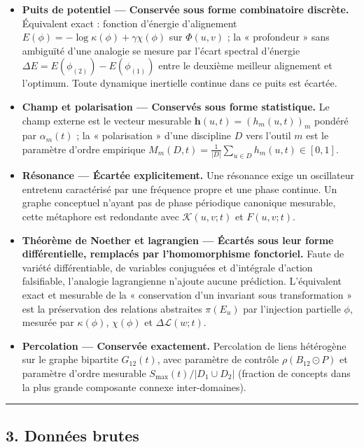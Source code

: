 \documentclass[a4paper,11pt]{article}
\providecommand{\tightlist}{\setlength{\itemsep}{0pt}\setlength{\parskip}{0pt}}
\begin{document}
\begin{itemize}
\tightlist
\item
  \textbf{Puits de potentiel --- Conservée sous forme combinatoire
  discrète.} Équivalent exact : fonction d'énergie d'alignement
  \(E(\phi) = -\log \kappa(\phi) + \gamma \chi(\phi)\) sur \(\Phi(u,v)\)
  ; la « profondeur » sans ambiguïté d'une analogie se mesure par
  l'écart spectral d'énergie
  \(\Delta E = E(\phi_{(2)}) - E(\phi_{(1)})\) entre le deuxième
  meilleur alignement et l'optimum. Toute dynamique inertielle continue
  dans ce puits est écartée.
\item
  \textbf{Champ et polarisation --- Conservés sous forme statistique.}
  Le champ externe est le vecteur mesurable
  \(\mathbf{h}(u,t) = (h_m(u,t))_m\) pondéré par \(\alpha_m(t)\) ; la «
  polarisation » d'une discipline \(D\) vers l'outil \(m\) est le
  paramètre d'ordre empirique
  \(M_m(D, t) = \frac{1}{|D|}\sum_{u \in D} h_m(u, t) \in [0, 1]\).
\item
  \textbf{Résonance --- Écartée explicitement.} Une résonance exige un
  oscillateur entretenu caractérisé par une fréquence propre et une
  phase continue. Un graphe conceptuel n'ayant pas de phase périodique
  canonique mesurable, cette métaphore est redondante avec
  \(\mathcal{K}(u,v;t)\) et \(F(u,v;t)\).
\item
  \textbf{Théorème de Noether et lagrangien --- Écartés sous leur forme
  différentielle, remplacés par l'homomorphisme fonctoriel.} Faute de
  variété différentiable, de variables conjuguées et d'intégrale
  d'action falsifiable, l'analogie lagrangienne n'ajoute aucune
  prédiction. L'équivalent exact et mesurable de la « conservation d'un
  invariant sous transformation » est la préservation des relations
  abstraites \(\pi(E_u)\) par l'injection partielle \(\phi\), mesurée
  par \(\kappa(\phi)\), \(\chi(\phi)\) et \(\Delta \mathcal{L}(w; t)\).
\item
  \textbf{Percolation --- Conservée exactement.} Percolation de liens
  hétérogène sur le graphe bipartite \(G_{12}(t)\), avec paramètre de
  contrôle \(\rho(B_{12} \odot P)\) et paramètre d'ordre mesurable
  \(S_{\max}(t)/|D_1 \cup D_2|\) (fraction de concepts dans la plus
  grande composante connexe inter-domaines).
\end{itemize}

\begin{center}\rule{0.5\linewidth}{0.5pt}\end{center}

\subsection*{3. Données brutes}
\end{document}
